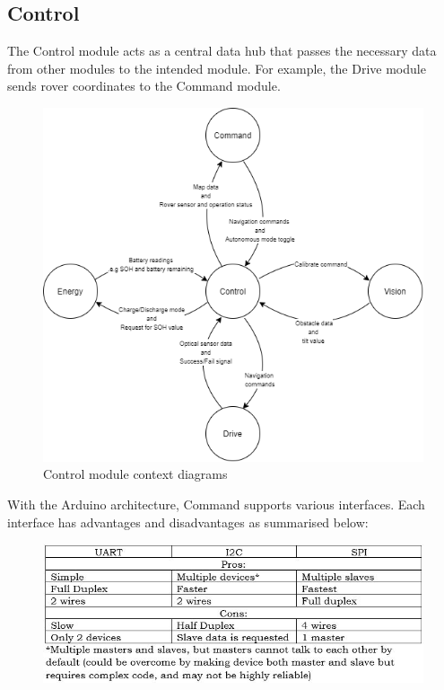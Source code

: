 \documentclass[11pt, a4paper]{article}
\begin{document}
\pagebreak

\subsection{Control}

The Control module acts as a central data hub that passes the necessary data from other modules to the intended module. For example, the Drive module sends rover coordinates to the Command module.

\begin{figure} [h!]
    \centering
    \includegraphics[scale=0.6]{Control_functional.png}
    \caption{Control module context diagrams}
\end{figure}

With the Arduino architecture, Command supports various interfaces. Each interface has advantages and disadvantages as summarised below:
\begin{figure} [h!]
    \centering
    \includegraphics[scale=0.7]{Control_table.JPG}
\end{figure}
\end{document}

